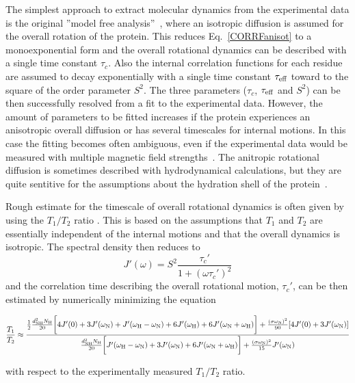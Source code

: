 \documentclass[pre,aps,floatfix,authordate1-4,twocolumn]{revtex4-1}
\begin{document}
The simplest approach to extract molecular dynamics from the experimental
data is the original ''model free analysis''~\cite{Lipari82},
where an isotropic diffusion is assumed for the overall rotation of the protein.
This reduces Eq.~\ref{CORRFanisot} to a monoexponential form and the overall rotational
dynamics can be described with a single time constant $\tau_c$.
Also the internal correlation functions for each residue are assumed
to decay exponentially with a single time constant $\tau_{\rm eff}$
toward to the square of the order parameter $S^2$. The three parameters
($\tau_c$, $\tau_{\rm eff}$ and $S^2$) can be then successfully resolved from a
fit to the experimental data.
However, the amount of parameters to be fitted increases if the protein
experiences an anisotropic overall diffusion or has several timescales for internal motions.
In this case the fitting becomes often ambiguous, even if the experimental data
would be measured with multiple magnetic field strengths~\cite{dosset00,luginbuhl97,jarymowycz06}.
The anitropic rotational diffusion is sometimes described with hydrodynamical
calculations, but they are quite sentitive for the assumptions about the
hydration shell of the protein~\cite{torre00}.

Rough estimate for the timescale of overall rotational dynamics 
is often given by using the $T_1/T_2$ ratio \cite{kay89}. 
This is based on the assumptions that $T_1$ and $T_2$
are essentially independent of the internal motions and that the overall
dynamics is isotropic. The spectral density then reduces to 
\begin{equation}
J'(\omega) = S^2\frac{\tau_c'}{1+(\omega \tau_c')^2} 
\end{equation}
and the correlation time describing the overall rotational motion, $\tau_c'$, can 
be then estimated by numerically minimizing the equation
\begin{widetext}
\begin{equation}\label{ratioEQ}
  \frac{T_1}{T_2} \approx  \frac{\frac{1}{2}\frac{d_{\rm{NH}}^2N_{\rm{H}}}{20}\bigg[4J'(0)+3J'(\omega_{\rm{N}})+J'(\omega_{\rm{H}}-\omega_{\rm{N}})+6J'(\omega_{\rm{H}})  +6J'(\omega_{\rm{N}}+\omega_{\rm{H}})\bigg]+\frac{(\sigma \omega_{\rm{N}})^2}{90}[4J'(0) +3J'(\omega_{\rm{N}})]}{\frac{d_{\rm{NH}}^2N_{\rm{H}}}{20}\bigg[J'(\omega_{\rm{H}}-\omega_{\rm{N}})+3J'(\omega_{\rm{N}})+6J'(\omega_{\rm{N}}+\omega_{\rm{H}})\bigg] +\frac{(\sigma \omega_{\rm{N}})^2}{15}J'(\omega_{\rm{N}})}
\end{equation}
\end{widetext}
with respect to the experimentally measured $T_1/T_2$ ratio.
\end{document}
